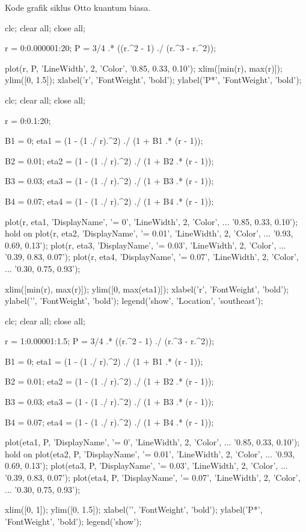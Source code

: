 Kode grafik siklus Otto kuantum biasa.
\begin{verbatim*}
clc; clear all; close all;

r = 0:0.000001:20;
P = 3/4 .* ((r.^2 - 1) ./ (r.^3 - r.^2));

plot(r, P, 'LineWidth', 2, 'Color', '0.85, 0.33, 0.10');
xlim([min(r), max(r)]);
ylim([0, 1.5]);
xlabel('r', 'FontWeight', 'bold');
ylabel('P*', 'FontWeight', 'bold');

clc; clear all; close all;

r = 0:0.1:20;

B1 = 0;
eta1 = (1 - (1 ./ r).^2) ./ (1 + B1 .* (r - 1));

B2 = 0.01;
eta2 = (1 - (1 ./ r).^2) ./ (1 + B2 .* (r - 1));

B3 = 0.03;
eta3 = (1 - (1 ./ r).^2) ./ (1 + B3 .* (r - 1));

B4 = 0.07;
eta4 = (1 - (1 ./ r).^2) ./ (1 + B4 .* (r - 1));

plot(r, eta1, 'DisplayName', '\beta = 0', 'LineWidth', 2, 'Color', ...
'0.85, 0.33, 0.10');
hold on
plot(r, eta2, 'DisplayName', '\beta = 0.01', 'LineWidth', 2, 'Color', ...
'0.93, 0.69, 0.13');
plot(r, eta3, 'DisplayName', '\beta = 0.03', 'LineWidth', 2, 'Color', ...
'0.39, 0.83, 0.07');
plot(r, eta4, 'DisplayName', '\beta = 0.07', 'LineWidth', 2, 'Color', ...
'0.30, 0.75, 0.93');

xlim([min(r), max(r)]);
ylim([0, max(eta1)]);
xlabel('r', 'FontWeight', 'bold');
ylabel('\eta', 'FontWeight', 'bold');
legend('show', 'Location', 'southeast');

clc; clear all; close all;

r = 1:0.00001:1.5;
P = 3/4 .* ((r.^2 - 1) ./ (r.^3 - r.^2));

B1 = 0;
eta1 = (1 - (1 ./ r).^2) ./ (1 + B1 .* (r - 1));

B2 = 0.01;
eta2 = (1 - (1 ./ r).^2) ./ (1 + B2 .* (r - 1));

B3 = 0.03;
eta3 = (1 - (1 ./ r).^2) ./ (1 + B3 .* (r - 1));

B4 = 0.07;
eta4 = (1 - (1 ./ r).^2) ./ (1 + B4 .* (r - 1));

plot(eta1, P, 'DisplayName', '\beta = 0', 'LineWidth', 2, 'Color', ...
    '0.85, 0.33, 0.10');
hold on
plot(eta2, P, 'DisplayName', '\beta = 0.01', 'LineWidth', 2, 'Color', ...
    '0.93, 0.69, 0.13');
plot(eta3, P, 'DisplayName', '\beta = 0.03', 'LineWidth', 2, 'Color', ...
    '0.39, 0.83, 0.07');
plot(eta4, P, 'DisplayName', '\beta = 0.07', 'LineWidth', 2, 'Color', ...
    '0.30, 0.75, 0.93');

xlim([0, 1]);
ylim([0, 1.5]);
xlabel('\eta', 'FontWeight', 'bold');
ylabel('P*', 'FontWeight', 'bold');
legend('show');
\end{verbatim*}

